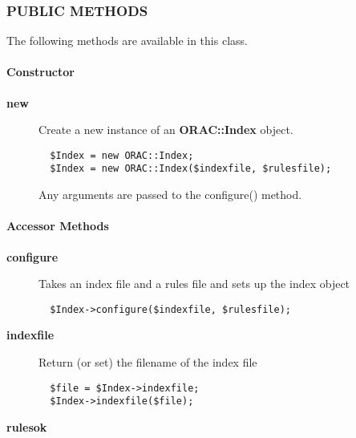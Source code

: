 \begin{description}
\subsubsection*{PUBLIC METHODS\label{ORAC::Index_PUBLIC_METHODS}}


The following methods are available in this class.

\paragraph*{Constructor\label{ORAC::Index_Constructor}}
\begin{description}

\item[{\textbf{new}}] \mbox{}

Create a new instance of an \textbf{ORAC::Index} object.

\begin{verbatim}
  $Index = new ORAC::Index;
  $Index = new ORAC::Index($indexfile, $rulesfile);
\end{verbatim}


Any arguments are passed to the configure() method.

\end{description}
\paragraph*{Accessor Methods\label{ORAC::Index_Accessor_Methods}}
\begin{description}

\item[{\textbf{configure}}] \mbox{}

Takes an index file and a rules file and sets up the index object

\begin{verbatim}
  $Index->configure($indexfile, $rulesfile);
\end{verbatim}

\item[{\textbf{indexfile}}] \mbox{}

Return (or set) the filename of the index file

\begin{verbatim}
  $file = $Index->indexfile;
  $Index->indexfile($file);
\end{verbatim}

\item[{\textbf{rulesok}}] \mbox{}


\end{description}
\end{description}
